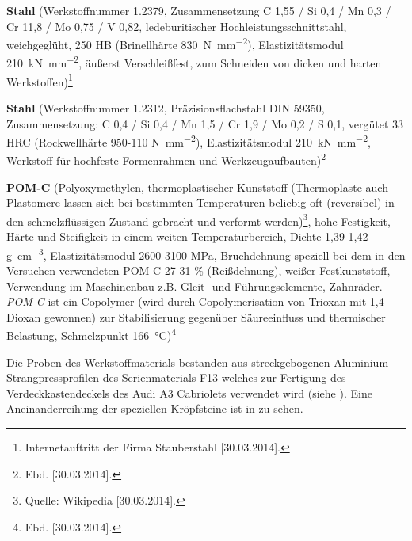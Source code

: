 \documentclass[12pt,a4paper,parskip,twoside,BCOR5mm,headsepline]{scrartcl}
\begin{document}
\begin{description*}
\begin{itemize*}
\item \textbf{Stahl} (Werkstoffnummer 1.2379, Zusammensetzung C 1,55 / Si 0,4 / Mn 0,3 / Cr 11,8 / Mo 0,75 / V 0,82, ledeburitischer Hochleistungsschnittstahl,  weichgeglüht, 250 HB (Brinellhärte \SI{830}{\newton\per\milli\meter\squared}), Elastizitätsmodul  \SI{210}{\kilo\newton\per\milli\meter\squared}, äußerst Verschleißfest, zum Schneiden von dicken und harten Werkstoffen)\footnote{Internetauftritt der Firma Stauberstahl [30.03.2014].}
\item \textbf{Stahl} (Werkstoffnummer 1.2312, Präzisionsflachstahl DIN 59350, Zusammensetzung: C 0,4 / Si 0,4 / Mn 1,5 / Cr 1,9 / Mo 0,2 / S 0,1, vergütet 33 HRC (Rockwellhärte 950-110 \si{\newton\per\milli\meter\squared}), Elastizitätsmodul \SI{210}{\kilo\newton\per\milli\meter\squared}, Werkstoff für hochfeste Formenrahmen und Werkzeugaufbauten)\footnote{Ebd. [30.03.2014].}
\item \textbf{POM-C} (Polyoxymethylen, thermoplastischer Kunststoff (Thermoplaste auch Plastomere lassen sich bei bestimmten Temperaturen beliebig oft (reversibel) in den schmelzflüssigen Zustand gebracht und verformt werden)\footnote{Quelle: Wikipedia [30.03.2014].},  hohe Festigkeit,  Härte und Steifigkeit in einem weiten Temperaturbereich, Dichte 1,39-1,42 \si{\gram\per\centi\meter\cubed}, Elastizitätsmodul 2600-3100 \si{\mega\pascal}, Bruchdehnung  speziell bei dem in den Versuchen verwendeten POM-C 27-31 \si{\percent} (Reißdehnung), weißer Festkunststoff, Verwendung im Maschinenbau z.B. Gleit- und Führungselemente, Zahnräder. \emph{POM-C} ist ein Copolymer (wird durch Copolymerisation von Trioxan mit 1,4 Dioxan gewonnen) zur Stabilisierung gegenüber Säureeinfluss und thermischer Belastung, Schmelzpunkt 
\SI{166}{\degreeCelsius})\footnote{Ebd. [30.03.2014].}
\end{itemize*}
\newpage

Die Proben des Werkstoffmaterials bestanden aus streckgebogenen Aluminium Strangpressprofilen des Serienmaterials F13 welches zur Fertigung des Verdeckkastendeckels des Audi A3 Cabriolets verwendet wird  (siehe ). Eine Aneinanderreihung der speziellen Kröpfsteine ist in  zu sehen.
  




\end{description*}
\end{document}
